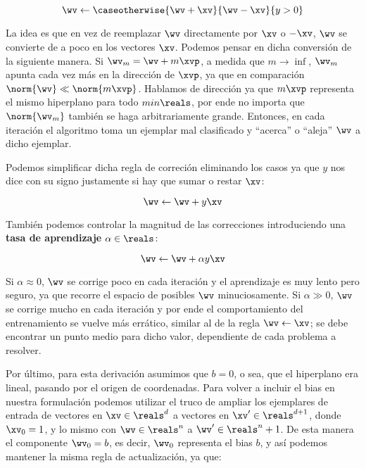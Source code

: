 \begin{equation}
\wv \leftarrow \caseotherwise{\wv+\xv}{\wv-\xv}{ y>0}
\end{equation}

La idea es que en vez de reemplazar $\wv$ directamente por $\xv$ o $-\xv$, $\wv$ se convierte de a poco en los vectores $\xv$. Podemos pensar en dicha conversión de la siguiente manera. Si $\wv_m= \wv + m \xvp$, a medida que $m \rightarrow \inf$, $\wv_m$ apunta cada vez más en la dirección de $\xvp$, ya que en comparación $ \norm{\wv} \ll \norm{m \xvp}$. Hablamos de dirección ya que $m \xvp$ representa el mismo hiperplano para todo $m in \reals$, por ende no importa que $\norm{\wv_m}$ también se haga arbitrariamente grande. Entonces, en cada iteración el algoritmo toma un ejemplar mal clasificado y ``acerca'' o ``aleja'' $\wv$ a dicho ejemplar.
 
Podemos simplificar dicha regla de correción eliminando los casos ya que $y$ nos dice con su signo justamente si hay que sumar o restar $\xv$:

\begin{equation}
\wv \leftarrow \wv + y \xv
\end{equation}

También podemos controlar la magnitud de las correcciones introduciendo una \textbf{tasa de aprendizaje} $\alpha \in \reals$:

\begin{equation}
\wv \leftarrow \wv +  \alpha y \xv
\end{equation}

Si $\alpha \approx 0$, $\wv$ se corrige poco en cada iteración y el aprendizaje es muy lento pero seguro, ya que recorre el espacio de posibles $\wv$ minuciosamente. Si $\alpha \gg 0$, $\wv$ se corrige mucho en cada iteración y por ende el comportamiento del entrenamiento se vuelve más errático, similar al de la regla $\wv \leftarrow \xv$; se debe encontrar un punto medio para dicho valor, dependiente de cada problema a resolver.

Por último, para esta derivación asumimos que $b=0$, o sea, que el hiperplano era lineal, pasando por el origen de coordenadas. Para volver a incluir el bias en nuestra formulación podemos utilizar el truco de ampliar los ejemplares de entrada de vectores en $\xv \in \reals^d$ a vectores en $\xv' \in \reals^{d+1}$, donde $\xv_0=1$, y lo mismo con $\wv \in \reals^n$ a  $\wv' \in \reals^n+1$. De esta manera el componente $\wv_0=b$, es decir, $\wv_0$ representa el bias $b$, y así podemos mantener la misma regla de actualización, ya que:

